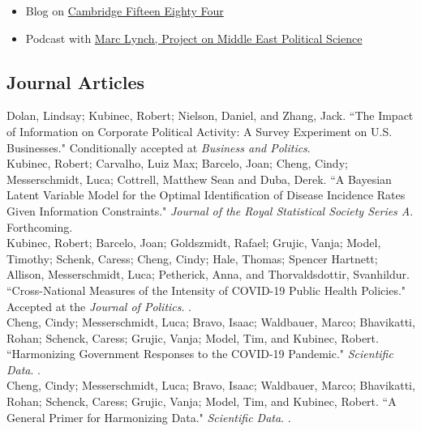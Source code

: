 \documentclass[11pt, a4paper]{article}
\newcommand{\years}[1]{\marginnote{\scriptsize #1}}
\begin{document}
\begin{itemize}
	\item Blog on \href{https://www.cambridgeblog.org/2023/07/arabs-want-democracy-but-not-with-corruption/}{Cambridge Fifteen Eighty Four}
	\item Podcast with \href{https://pomeps.org/making-democracy-safe-for-business-apsa-virtual-posters-s-13-ep-1}{Marc Lynch, Project on Middle East Political Science}
\end{itemize}

 \newpage
 
\subsection*{Journal Articles}

\years{2024} Dolan, Lindsay; Kubinec, Robert; Nielson, Daniel, and Zhang, Jack. ``The Impact of Information on Corporate Political Activity: A Survey Experiment on U.S. Businesses." Conditionally accepted at \emph{Business and Politics}. \\

\years{2024} Kubinec, Robert; Carvalho, Luiz Max; Barcelo, Joan; Cheng, Cindy; Messerschmidt, Luca; Cottrell, Matthew Sean and Duba, Derek. ``A Bayesian Latent Variable Model for the Optimal Identification of Disease Incidence Rates Given Information Constraints." \emph{Journal of the Royal Statistical Society Series A}. Forthcoming. \\

\years{2024} Kubinec, Robert; Barcelo, Joan; Goldszmidt, Rafael; Grujic, Vanja; Model, Timothy; Schenk, Caress; Cheng, Cindy; Hale, Thomas; Spencer Hartnett; Allison, Messerschmidt, Luca; Petherick, Anna, and Thorvaldsdottir, Svanhildur. ``Cross-National Measures of the Intensity of COVID-19 Public Health Policies." Accepted at the \emph{Journal of Politics}. .\\

\years{2024} Cheng, Cindy; Messerschmidt, Luca; Bravo, Isaac; Waldbauer, Marco; Bhavikatti, Rohan; Schenck, Caress; Grujic, Vanja; Model, Tim, and Kubinec, Robert. ``Harmonizing Government Responses to the COVID-19 Pandemic." \emph{Scientific Data}. .\\

\years{2023} Cheng, Cindy; Messerschmidt, Luca; Bravo, Isaac; Waldbauer, Marco; Bhavikatti, Rohan; Schenck, Caress; Grujic, Vanja; Model, Tim, and Kubinec, Robert. ``A General Primer for Harmonizing Data." \emph{Scientific Data}. .\\
\end{document}
